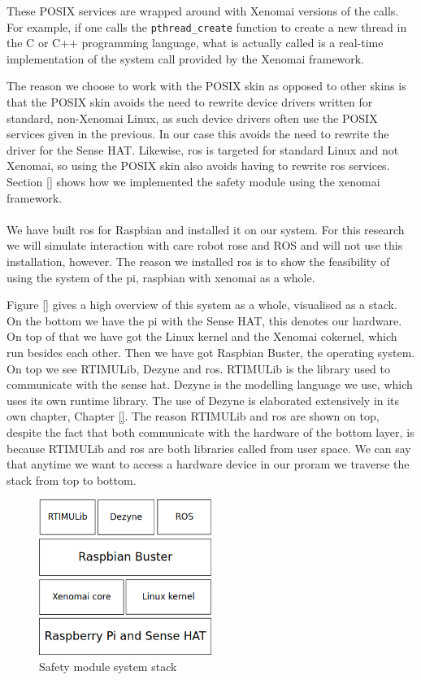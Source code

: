 \documentclass[12pt]{scrreprt}
\begin{document}
These POSIX services are wrapped around with Xenomai versions of the calls. For example, if one calls the \texttt{pthread_create} function to create a new thread in the C or C++ programming language, what is actually called is a real-time implementation of the system call provided by the Xenomai framework.
\par
The reason we choose to work with the POSIX skin as opposed to other skins is that the POSIX skin avoids the need to rewrite device drivers written for standard, non-Xenomai Linux, as such device drivers often use the POSIX services given in the previous. In our case this avoids the need to rewrite the driver for the Sense HAT. Likewise, \acrshort{ros} is targeted for standard Linux and not Xenomai, so using the POSIX skin also avoids having to rewrite \acrshort{ros} services. Section \ref{} shows how we implemented the safety module using the xenomai framework.
\\\\
We have built \acrshort{ros} for Raspbian and installed it on our system. For this research we will simulate interaction with care robot rose and ROS and will not use this installation, however. The reason we installed \acrshort{ros} is to show the feasibility of using the system of the \gls{pi}, raspbian with xenomai as a whole.
\par
Figure \ref{} gives a high overview of this system as a whole, visualised as a stack. On the bottom we have the \gls{pi} with the Sense HAT, this denotes our hardware. On top of that we have got the Linux kernel and the Xenomai cokernel, which run besides each other. Then we have got Raspbian Buster, the operating system. On top we see RTIMULib, Dezyne and \acrshort{ros}. RTIMULib is the library used to communicate with the sense hat. Dezyne is the modelling language we use, which uses its own runtime library. The use of Dezyne is elaborated extensively in its own chapter, Chapter \ref{}. The reason RTIMULib and \acrshort{ros} are shown on top, despite the fact that both communicate with the hardware of the bottom layer, is because RTIMULib and \acrshort{ros} are both libraries called from user space. We can say that anytime we want to access a hardware device in our proram we traverse the stack from top to bottom.

\begin{figure}[H]
    \centering
    \includegraphics[width=0.5\textwidth]{Figures/results/os_environment_stack.png}
    \caption{Safety module system stack}
    \label{fig:my_label}
\end{figure}
\end{document}
